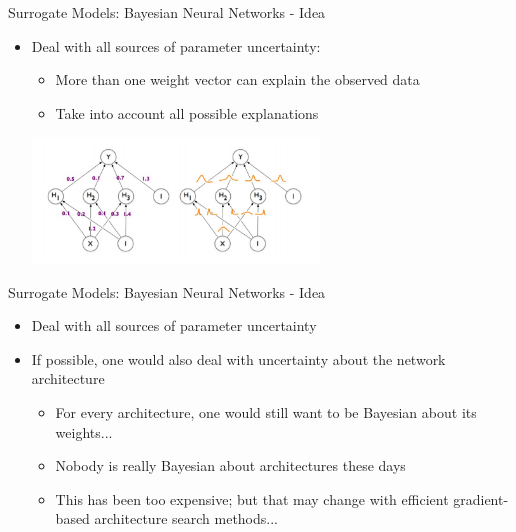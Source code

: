 \begin{frame}[c]{Surrogate Models: Bayesian Neural Networks - Idea}

\begin{itemize}
    \item Deal with all sources of parameter uncertainty: \pause
    \begin{itemize}
        \item More than one weight vector can explain the observed data 
        \item Take into account all possible explanations 
    \end{itemize}

\centering
\includegraphics[width=0.6\textwidth]{images/surrogate_models/bnn.jpg}

\end{itemize}


\end{frame}

\begin{frame}[c]{Surrogate Models: Bayesian Neural Networks - Idea}

\begin{itemize}
    \item Deal with all sources of parameter uncertainty
    \item If possible, one would also deal with uncertainty about the network architecture
     \begin{itemize}
        \item For every architecture, one would still want to be Bayesian about its weights... 
        \item Nobody is really Bayesian about architectures these days 
        \item This has been too expensive; but that may change with efficient
gradient-based architecture search methods...
    \end{itemize}
\end{itemize}

\end{frame}


